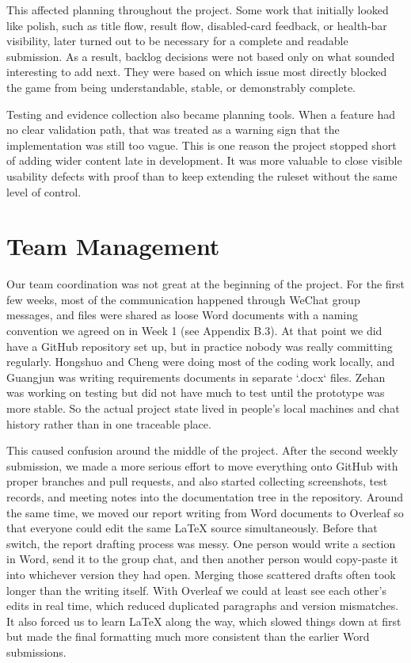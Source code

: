 This affected planning throughout the project. Some work that initially looked like polish, such as title flow, result flow, disabled-card feedback, or health-bar visibility, later turned out to be necessary for a complete and readable submission. As a result, backlog decisions were not based only on what sounded interesting to add next. They were based on which issue most directly blocked the game from being understandable, stable, or demonstrably complete.

Testing and evidence collection also became planning tools. When a feature had no clear validation path, that was treated as a warning sign that the implementation was still too vague. This is one reason the project stopped short of adding wider content late in development. It was more valuable to close visible usability defects with proof than to keep extending the ruleset without the same level of control.

\section{Team Management}

Our team coordination was not great at the beginning of the project. For the first few weeks, most of the communication happened through WeChat group messages, and files were shared as loose Word documents with a naming convention we agreed on in Week 1 (see Appendix B.3). At that point we did have a GitHub repository set up, but in practice nobody was really committing regularly. Hongshuo and Cheng were doing most of the coding work locally, and Guangjun was writing requirements documents in separate `.docx` files. Zehan was working on testing but did not have much to test until the prototype was more stable. So the actual project state lived in people's local machines and chat history rather than in one traceable place.

This caused confusion around the middle of the project. After the second weekly submission, we made a more serious effort to move everything onto GitHub with proper branches and pull requests, and also started collecting screenshots, test records, and meeting notes into the documentation tree in the repository. Around the same time, we moved our report writing from Word documents to Overleaf so that everyone could edit the same LaTeX source simultaneously. Before that switch, the report drafting process was messy. One person would write a section in Word, send it to the group chat, and then another person would copy-paste it into whichever version they had open. Merging those scattered drafts often took longer than the writing itself. With Overleaf we could at least see each other's edits in real time, which reduced duplicated paragraphs and version mismatches. It also forced us to learn LaTeX along the way, which slowed things down at first but made the final formatting much more consistent than the earlier Word submissions.


